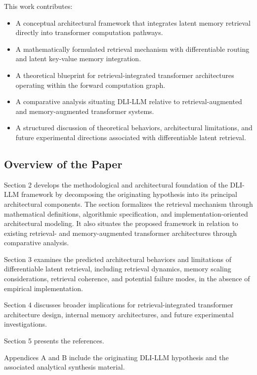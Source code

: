\documentclass[
]{article}
\begin{document}
This work contributes:

\begin{itemize}
\item
  A conceptual architectural framework that integrates latent memory
  retrieval directly into transformer computation pathways.
\item
  A mathematically formulated retrieval mechanism with differentiable
  routing and latent key-value memory integration.
\item
  A theoretical blueprint for retrieval-integrated transformer
  architectures operating within the forward computation graph.
\item
  A comparative analysis situating DLI-LLM relative to
  retrieval-augmented and memory-augmented transformer systems.
\item
  A structured discussion of theoretical behaviors, architectural
  limitations, and future experimental directions associated with
  differentiable latent retrieval.
\end{itemize}

\hypertarget{overview-of-the-paper}{%
\subsection{Overview of the Paper}\label{overview-of-the-paper}}

Section 2 develops the methodological and architectural foundation of
the DLI-LLM framework by decomposing the originating hypothesis into its
principal architectural components. The section formalizes the retrieval
mechanism through mathematical definitions, algorithmic specification,
and implementation-oriented architectural modeling. It also situates the
proposed framework in relation to existing retrieval- and
memory-augmented transformer architectures through comparative analysis.

Section 3 examines the predicted architectural behaviors and limitations
of differentiable latent retrieval, including retrieval dynamics, memory
scaling considerations, retrieval coherence, and potential failure
modes, in the absence of empirical implementation.

Section 4 discusses broader implications for retrieval-integrated
transformer architecture design, internal memory architectures, and
future experimental investigations.

Section 5 presents the references.

Appendices A and B include the originating DLI-LLM hypothesis and the
associated analytical synthesis material.
\end{document}
